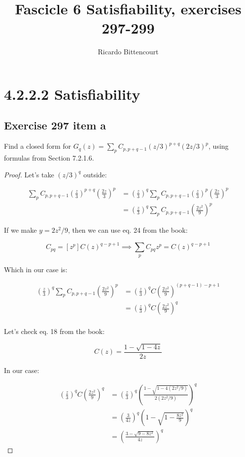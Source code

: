 \documentclass[10pt]{book}
\begin{document}
\title{Fascicle 6 Satisfiability, exercises 297-299}
\author{Ricardo Bittencourt}
\maketitle

\chapter{4.2.2.2 Satisfiability}

\section{Exercise 297 item a}

Find a closed form for $G_q(z)=\sum_p C_{p,p+q-1}(z/3)^{p+q}(2z/3)^p$, using formulas from Section 7.2.1.6.

\begin{proof}
Let's take $(z/3)^q$ outside:

\begin{align*}
  \sum_p C_{p,p+q-1}\left(\frac{z}{3}\right)^{p+q}\left(\frac{2z}{3}\right)^p 
  &= \left(\frac{z}{3}\right)^q\sum_p C_{p,p+q-1}\left(\frac{z}{3}\right)^p\left(\frac{2z}{3}\right)^p \\
  &= \left(\frac{z}{3}\right)^q\sum_p C_{p,p+q-1}\left(\frac{2z^2}{9}\right)^p
\end{align*}

If we make $y=2z^2/9$, then we can use eq. 24 from the book:

$$C_{pq}=[z^p]C(z)^{q-p+1} \implies \sum_pC_{pq}z^p = C(z)^{q-p+1}$$

Which in our case is:

\begin{align*}
  \left(\frac{z}{3}\right)^q\sum_p C_{p,p+q-1}\left(\frac{2z^2}{9}\right)^p
  &= \left(\frac{z}{3}\right)^q C\left(\frac{2z^2}{9}\right)^{(p+q-1)-p+1} \\
  &= \left(\frac{z}{3}\right)^q C\left(\frac{2z^2}{9}\right)^q \\
\end{align*}

Let's check eq. 18 from the book:

$$C(z)=\frac{1-\sqrt{1-4z}}{2z}$$

In our case:

\begin{align*}
  \left(\frac{z}{3}\right)^q C\left(\frac{2z^2}{9}\right)^q 
    &= \left(\frac{z}{3}\right)^q 
       \left( \frac{1-\sqrt{1-4(2z^2/9)}}{2(2z^2/9)} \right) ^q \\
       &= \left(\frac{3}{4z}\right)^q
       \left(1-\sqrt{1-\frac{8z^2}{9}}\right)^q \\
  &= \left(\frac{3-\sqrt{9-8z^2}}{4z}\right)^q
\end{align*}

\qedhere
\end{proof}
\end{document}
